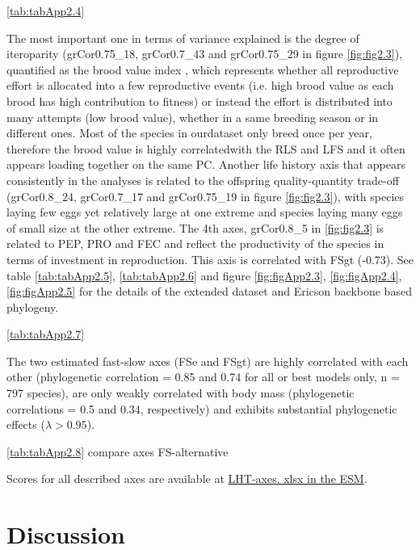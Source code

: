\ref{tab:tabApp2.4}

The most important one in terms of variance explained is the degree of
iteroparity (grCor0.75\_18, grCor0.7\_43 and grCor0.75\_29 in figure
\ref{fig:fig2.3}), quantified as the brood value index \citep{Bokony2009}⁠,
which represents whether all reproductive effort is allocated into a few
reproductive events (i.e. high brood value as each brood has high contribution
to fitness) or instead the effort is distributed into many attempts (low brood
value), whether in a same breeding season or in different ones. Most of the
species in ourdataset only breed once per year, therefore the brood value is
highly correlatedwith the RLS and LFS and it often appears loading together on
the same PC.
Another life history axis that appears consistently in the analyses is related 
to the offspring quality-quantity trade-off (grCor0.8\_24, grCor0.7\_17 and 
grCor0.75\_19 in figure \ref{fig:fig2.3}), with species laying few eggs yet
relatively large at one extreme and species laying many eggs of small size at
the other extreme. The 4th axes, grCor0.8\_5 in \ref{fig:fig2.3} is related to
PEP, PRO and FEC and reflect the productivity of the species in terms of
investment in reproduction. This axis is correlated with FSgt (-0.73). See table
\ref{tab:tabApp2.5}, \ref{tab:tabApp2.6} and figure \ref{fig:figApp2.3},
\ref{fig:figApp2.4}, \ref{fig:figApp2.5} for the details of the extended
dataset and Ericson backbone based phylogeny.

\ref{tab:tabApp2.7}

The two estimated fast-slow axes (FSe and FSgt) are highly correlated with each
other (phylogenetic correlation =  0.85 and 0.74 for all or best models
only, n = 797 species), are only weakly correlated with body mass (phylogenetic
correlations = 0.5 and 0.34, respectively) and exhibits substantial phylogenetic
effects ($\lambda > 0.95$).

\ref{tab:tabApp2.8} compare axes FS-alternative

Scores for all described axes are available at
\href{https://github.com/jmaspons/Thesis/tree/master/ESM/chapter02}{LHT-axes.
xlsx in the ESM}.


\section{Discussion}

